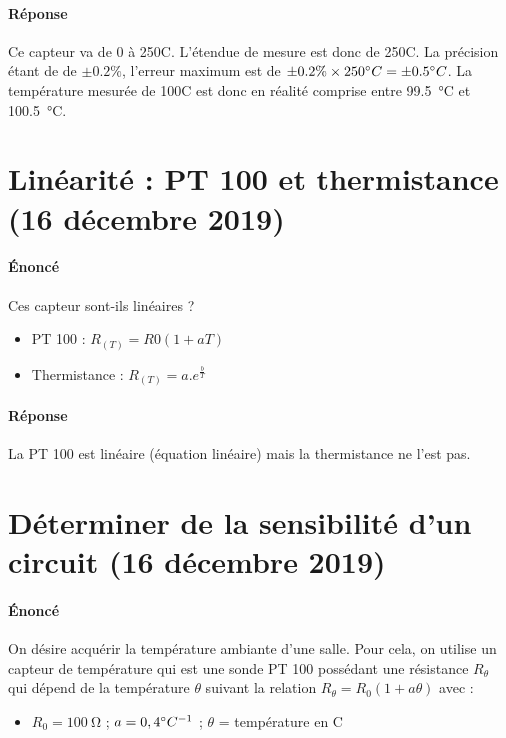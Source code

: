 \documentclass{article}
\begin{document}
\paragraph{Réponse}
Ce capteur va de 0 à 250\degree C. L'étendue de mesure est donc de 250\degree C. La précision étant de de $\pm 0.2\%$, l'erreur maximum est de $\pm 0.2\% \times 250\degree C = \pm 0.5\degree C$. La température mesurée de 100\degree C est donc en réalité comprise entre \SI{99.5}{\celsius} et \SI{100.5}{\celsius}.

\section{Linéarité : PT 100 et thermistance (16 décembre 2019)}
\paragraph{Énoncé}
Ces capteur sont-ils linéaires ?
\begin{itemize}
    \item PT 100 : $R_{\left(T\right)} = R0\left(1 + aT\right)$
    \item Thermistance : $R_{\left(T\right)} = a.e^{\frac{b}{T}}$
\end{itemize}

\paragraph{Réponse}
La PT 100 est linéaire (équation linéaire) mais la thermistance ne l'est pas.


\newpage
\section{Déterminer de la sensibilité d'un circuit (16 décembre 2019)}
\paragraph{Énoncé}
On désire acquérir la température ambiante d'une salle. Pour cela, on utilise un capteur de température qui est une sonde PT 100 possédant une résistance $R_{\theta}$ qui dépend de la température $\theta$ suivant la relation $R_\theta = R_0\left(1 + a\theta \right)$ avec :
\begin{itemize}
    \item[] $R_0 = \SI{100}{\ohm}$ ; $a = 0,4\degree C^{-1}$ ; $\theta$ = température en \degree C
\end{itemize}
\end{document}
